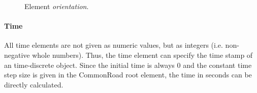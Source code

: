 \begin{figure}[!htpb]
	\small
	\caption{Element \textit{orientation}.}
	\label{fig:XML_orientation}
\end{figure}

\paragraph{Time}
All time elements are not given as numeric values, but as integers (i.e. non-negative whole numbers). Thus, the time element can specify the time stamp of an time-discrete object. Since the initial time is always $0$ and the constant time step size is given in the CommonRoad root element, the time in seconds can be directly calculated.
